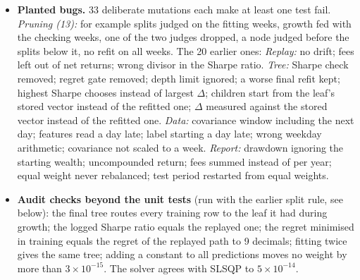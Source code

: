 \documentclass[11pt,a4paper]{article}
\newcommand{\1}{\mathbf{1}}
\begin{document}
\begin{itemize}
\item \textbf{Planted bugs.} 33 deliberate mutations each make at least one test fail. \emph{Pruning (13):} for example splits judged on the fitting weeks, growth fed with the checking weeks, one of the two judges dropped, a node judged before the splits below it, no refit on all weeks. The 20 earlier ones: \emph{Replay:} no drift; fees left out of net returns; wrong divisor in the Sharpe ratio. \emph{Tree:} Sharpe check removed; regret gate removed; depth limit ignored; a worse final refit kept; highest Sharpe chooses instead of largest $\Delta$; children start from the leaf's stored vector instead of the refitted one; $\Delta$ measured against the stored vector instead of the refitted one. \emph{Data:} covariance window including the next day; features read a day late; label starting a day late; wrong weekday arithmetic; covariance not scaled to a week. \emph{Report:} drawdown ignoring the starting wealth; uncompounded return; fees summed instead of per year; equal weight never rebalanced; test period restarted from equal weights.
\item \textbf{Audit checks beyond the unit tests} (run with the earlier split rule, see below): the final tree routes every training row to the leaf it had during growth; the logged Sharpe ratio equals the replayed one; the regret minimised in training equals the regret of the replayed path to 9 decimals; fitting twice gives the same tree; adding a constant to all predictions moves no weight by more than $3\times10^{-15}$. The solver agrees with SLSQP to $5\times10^{-14}$.
\end{itemize}
\end{document}
